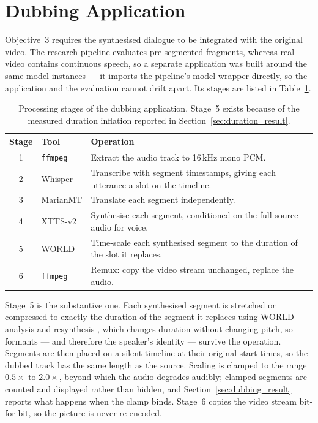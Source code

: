 \section{Dubbing Application}
\label{sec:webapp}

Objective~3 requires the synthesised dialogue to be integrated with the original video. The
research pipeline evaluates pre-segmented fragments, whereas real video contains continuous speech,
so a separate application was built around the same model instances --- it imports the pipeline's
model wrapper directly, so the application and the evaluation cannot drift apart. Its stages are
listed in Table~\ref{tab:webapp}.

\begin{table}[htbp]
\caption{Processing stages of the dubbing application. Stage~5 exists because of the measured
duration inflation reported in Section~\ref{sec:duration_result}.}
\label{tab:webapp}
\centering
{\singlespacing\small
\begin{tabular}{@{}clp{7.3cm}@{}}
\toprule
\textbf{Stage} & \textbf{Tool} & \textbf{Operation} \\
\midrule
1 & \texttt{ffmpeg}  & Extract the audio track to 16\,kHz mono PCM. \\
2 & Whisper          & Transcribe with segment timestamps, giving each utterance a slot on the timeline. \\
3 & MarianMT         & Translate each segment independently. \\
4 & XTTS-v2          & Synthesise each segment, conditioned on the full source audio for voice. \\
5 & WORLD            & Time-scale each synthesised segment to the duration of the slot it replaces. \\
6 & \texttt{ffmpeg}  & Remux: copy the video stream unchanged, replace the audio. \\
\bottomrule
\end{tabular}\par}
\end{table}

Stage~5 is the substantive one. Each synthesised segment is stretched or compressed to exactly the
duration of the segment it replaces using WORLD analysis and resynthesis \cite{morise2016world},
which changes duration without changing pitch, so formants --- and therefore the speaker's
identity --- survive the operation. Segments are then placed on a silent timeline at their original
start times, so the dubbed track has the same length as the source. Scaling is clamped to the range
$0.5\times$ to $2.0\times$, beyond which the audio degrades audibly; clamped segments are counted
and displayed rather than hidden, and Section~\ref{sec:dubbing_result} reports what happens when
the clamp binds. Stage~6 copies the video stream bit-for-bit, so the picture is never re-encoded.

